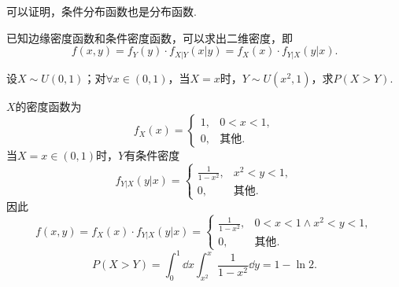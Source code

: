 可以证明，条件分布函数也是分布函数.

\begin{corollary}
已知边缘密度函数和条件密度函数，可以求出二维密度，即\[
	f(x,y) = f_Y(y) \cdot f_{X \vert Y}(x \vert y)
	= f_X(x) \cdot f_{Y \vert X}(y \vert x).
\]
\end{corollary}

\begin{example}
设\(X \sim U(0,1)\)；对\(\forall x\in(0,1)\)，当\(X=x\)时，\(Y \sim U(x^2,1)\)，求\(P(X > Y)\).
\begin{solution}
\(X\)的密度函数为\[
f_X(x) = \left\{ \begin{array}{cl}
1, & 0<x<1, \\
0, & \text{其他}.
\end{array} \right.
\]当\(X=x\in(0,1)\)时，\(Y\)有条件密度\[
f_{Y \vert X}(y \vert x)
= \left\{ \begin{array}{cl}
\frac{1}{1-x^2}, & x^2<y<1, \\
0, & \text{其他}.
\end{array} \right.
\]因此\[
f(x,y) = f_X(x) \cdot f_{Y \vert X}(y \vert x)
= \left\{ \begin{array}{cl}
\frac{1}{1-x^2}, & 0<x<1 \land x^2<y<1, \\
0, & \text{其他}.
\end{array} \right.
\]\[
P(X > Y)
= \int_0^1 \dd{x} \int_{x^2}^x \frac{1}{1-x^2} \dd{y}
= 1 - \ln2.
\]
\end{solution}
\end{example}
